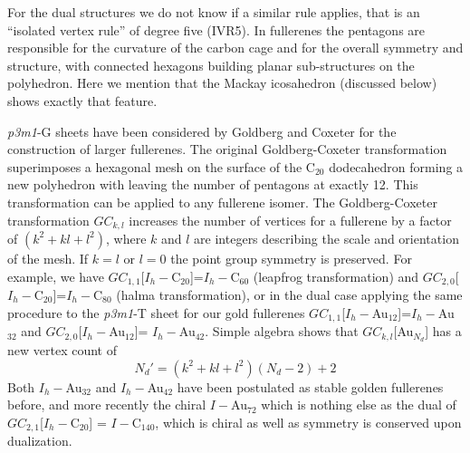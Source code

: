 For the dual structures we do not know if a similar rule applies, that is an ``isolated vertex rule'' of degree five (IVR5). In fullerenes the pentagons are responsible for the curvature of the carbon cage and for the overall symmetry and structure, with connected hexagons building planar sub-structures on the polyhedron. Here we mention that the Mackay icosahedron (discussed below) shows exactly that feature.

\textit{p3m1}-G sheets have been considered by Goldberg and Coxeter for the construction of larger fullerenes.\autocite{Goldberg_ClassMultiSymmetricPolyhedra_1937,Coxeter-1971,Dutour_GoldbergCoxeterConstructionvalent_2004} The original Goldberg-Coxeter transformation superimposes a hexagonal mesh on the surface of the C$_{20}$ dodecahedron forming a new polyhedron with leaving the number of pentagons at exactly 12.\autocite{Goldberg_ClassMultiSymmetricPolyhedra_1937,Coxeter-1971} This transformation can be applied to any fullerene isomer.\autocite{Schwerdtfeger_topologyfullerenes_2015} The Goldberg-Coxeter transformation $GC_{k,l}$ increases the number of vertices for a fullerene by a factor of $(k^2+kl+l^2)$, where $k$ and $l$ are integers describing the scale and orientation of the mesh.\autocite{Dutour_GoldbergCoxeterConstructionvalent_2004,Schwerdtfeger_topologyfullerenes_2015} If $k=l$ or $l=0$ the point group symmetry is preserved. For example, we have $GC_{1,1}$[$I_h-$C$_{20}$]=$I_h-$C$_{60}$ (leapfrog transformation)\autocite{Fowler-atlas-2006} and $GC_{2,0}$[$I_h-$C$_{20}$]=$I_h-$C$_{80}$ (halma transformation), or in the dual case applying the same procedure to the \textit{p3m1}-T sheet for our gold fullerenes $GC_{1,1}$[$I_h-$Au$_{12}$]=$I_h-$Au$_{32}$ and $GC_{2,0}$[$I_h-$Au$_{12}$]= $I_h-$Au$_{42}$. Simple algebra shows that $GC_{k,l}$[Au$_{N_d}$] has a new vertex count of
\begin{equation}
  \label{eq:dualvertex} 
N_d'=(k^2+kl+l^2)(N_d-2)+2 
\end{equation}
Both $I_h-$Au$_{32}$ and $I_h-$Au$_{42}$ have been postulated as stable golden fullerenes before,\autocite{Johansson_Au3224CaratGolden_2004}
and more recently the chiral $I-$Au$_{72}$\autocite{Karttunen_IcosahedralAu72_2008} which is nothing else as the dual of $GC_{2,1}$[$I_h-$C$_{20}$] = $I-$C$_{140}$, which is chiral as well as symmetry is conserved upon dualization.

